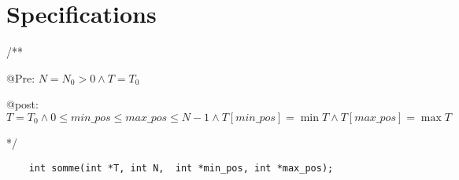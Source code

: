 \section{Specifications}\label{specifications}

\begingroup
/**
\par
\quad* @Pre: $N=N_0>0 \land T = T_0$
\par
\quad* @post: $T=T_0 \land 0 \le min\_pos \le max\_pos \le N-1 \land T[min\_pos]=\min{T} \land T[max\_pos]=\max{T}$
\par
*/
\endgroup
\begin{lstlisting}
    int somme(int *T, int N,  int *min_pos, int *max_pos);
\end{lstlisting}